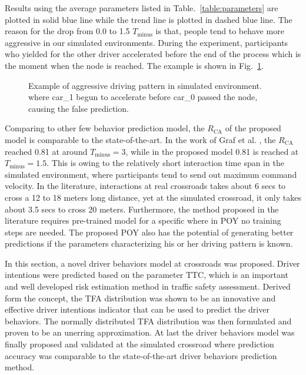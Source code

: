 Results using the average parameters listed in Table.~\ref{table:parameters} are plotted in solid blue line while the trend line is plotted in dashed blue line. The reason for the drop from 0.0 to 1.5 $T_{\mathrm{minus}}$ is that, people tend to behave more aggressive in our simulated environments. During the experiment, participants who yielded for the other driver accelerated before the end of the process which is the moment when the node is reached. The example is shown in Fig.~\ref{fig:trial039}.

\begin{figure}[htbp!]
\begin{center}
\end{center}
\caption{Example of aggressive driving pattern in simulated environment. where car\_1 begun to accelerate before car\_0 passed the node, causing the false prediction.}
\label{fig:trial039} 
\end{figure}

Comparing to other few behavior prediction model, the $R_{\mathrm{CA}}$ of the proposed model is comparable to the state-of-the-art. In the work of Graf et al. \cite{Graf2014}, the $R_{\mathrm{CA}}$ reached 0.81 at around $T_{\mathrm{minus}} = 3$, while in the proposed model 0.81 is reached at $T_{\mathrm{minus}} = 1.5$. This is owing to the relatively short interaction time span in the simulated environment, where participants tend to send out maximum command velocity. In the literature, interactions at real crossroads takes about 6 secs to cross a 12 to 18 meters long distance, yet at the simulated crossroad, it only takes about 3.5 secs to cross 20 meters. Furthermore, the method proposed in the literature requires pre-trained model for a specific where in POY no training steps are needed. The proposed POY also has the potential of generating better predictions if the parameters characterizing his or her driving pattern is known.


In this section, a novel driver behaviors model at crossroads was proposed. Driver intentions were predicted based on the parameter TTC, which is an important and well developed risk estimation method in traffic safety assessment. Derived form the concept, the TFA distribution was shown to be an innovative and effective driver intentions indicator that can be used to predict the driver behaviors. The normally distributed TFA distribution was then formulated and proven to be an unerring approximation. At last the driver behaviors model was finally proposed and validated at the simulated crossroad where prediction accuracy was comparable to the state-of-the-art driver behaviors prediction method. 

\newpage